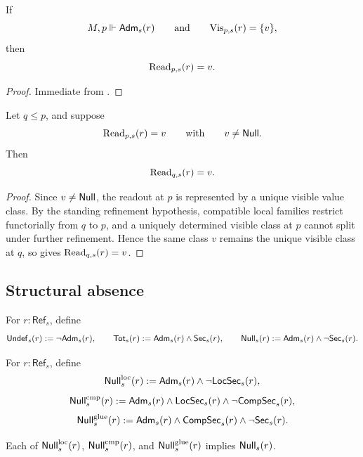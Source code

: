 \begin{corollary}\label{cor:nonnull-readout-criterion}
If
\[
M,p\Vdash \mathsf{Adm}_s(r)
\qquad\text{and}\qquad
\mathrm{Vis}_{p,s}(r)=\{v\},
\]
then
\[
\mathrm{Read}_{p,s}(r)=v.
\]
\end{corollary}

\begin{proof}
Immediate from .
\end{proof}

\begin{proposition}\label{prop:typed-readout-persistence}
Let $q\le p$, and suppose
\[
\mathrm{Read}_{p,s}(r)=v
\qquad\text{with}\qquad
v\neq \mathsf{Null}.
\]
Then
\[
\mathrm{Read}_{q,s}(r)=v.
\]
\end{proposition}

\begin{proof}
Since $v\neq\mathsf{Null}$, the readout at $p$ is represented by a unique visible value class. By the standing refinement hypothesis, compatible local families restrict functorially from $q$ to $p$, and a uniquely determined visible class at $p$ cannot split under further refinement. Hence the same class $v$ remains the unique visible class at $q$, so  gives $\mathrm{Read}_{q,s}(r)=v$.
\end{proof}

\subsection{Structural absence}

\begin{definition}\label{def:undef-total-null}
For $r:\mathsf{Ref}_s$, define
\[
\mathsf{Undef}_s(r):=\neg\mathsf{Adm}_s(r),\qquad
\mathsf{Tot}_s(r):=\mathsf{Adm}_s(r)\land \mathsf{Sec}_s(r),\qquad
\mathsf{Null}_s(r):=\mathsf{Adm}_s(r)\land \neg\mathsf{Sec}_s(r).
\]
\end{definition}

\begin{definition}\label{def:null-failure-modes}
For $r:\mathsf{Ref}_s$, define
\[
\mathsf{Null}^{\mathrm{loc}}_s(r):=\mathsf{Adm}_s(r)\land \neg\mathsf{LocSec}_s(r),
\]
\[
\mathsf{Null}^{\mathrm{cmp}}_s(r):=\mathsf{Adm}_s(r)\land \mathsf{LocSec}_s(r)\land \neg\mathsf{CompSec}_s(r),
\]
\[
\mathsf{Null}^{\mathrm{glue}}_s(r):=\mathsf{Adm}_s(r)\land \mathsf{CompSec}_s(r)\land \neg\mathsf{Sec}_s(r).
\]
\end{definition}

\begin{proposition}\label{prop:null-modes-imply-null}
Each of $\mathsf{Null}^{\mathrm{loc}}_s(r)$, $\mathsf{Null}^{\mathrm{cmp}}_s(r)$, and $\mathsf{Null}^{\mathrm{glue}}_s(r)$ implies $\mathsf{Null}_s(r)$.
\end{proposition}

